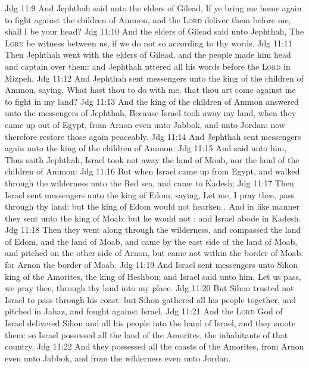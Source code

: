 \vs Jdg 11:9 And Jephthah said unto the elders of Gilead, If ye bring me home again to fight against the children of Ammon, and the \textsc{Lord} deliver them before me, shall I be your head?
\vs Jdg 11:10 And the elders of Gilead said unto Jephthah, The \textsc{Lord} be witness between us, if we do not so according to thy words.
\vs Jdg 11:11 Then Jephthah went with the elders of Gilead, and the people made him head and captain over them: and Jephthah uttered all his words before the \textsc{Lord} in Mizpeh.
\vs Jdg 11:12 And Jephthah sent messengers unto the king of the children of Ammon, saying, What hast thou to do with me, that thou art come against me to fight in my land?
\vs Jdg 11:13 And the king of the children of Ammon answered unto the messengers of Jephthah, Because Israel took away my land, when they came up out of Egypt, from Arnon even unto Jabbok, and unto Jordan: now therefore restore those  again peaceably.
\vs Jdg 11:14 And Jephthah sent messengers again unto the king of the children of Ammon:
\vs Jdg 11:15 And said unto him, Thus saith Jephthah, Israel took not away the land of Moab, nor the land of the children of Ammon:
\vs Jdg 11:16 But when Israel came up from Egypt, and walked through the wilderness unto the Red sea, and came to Kadesh;
\vs Jdg 11:17 Then Israel sent messengers unto the king of Edom, saying, Let me, I pray thee, pass through thy land: but the king of Edom would not hearken . And in like manner they sent unto the king of Moab: but he would not : and Israel abode in Kadesh.
\vs Jdg 11:18 Then they went along through the wilderness, and compassed the land of Edom, and the land of Moab, and came by the east side of the land of Moab, and pitched on the other side of Arnon, but came not within the border of Moab: for Arnon  the border of Moab.
\vs Jdg 11:19 And Israel sent messengers unto Sihon king of the Amorites, the king of Heshbon; and Israel said unto him, Let us pass, we pray thee, through thy land into my place.
\vs Jdg 11:20 But Sihon trusted not Israel to pass through his coast: but Sihon gathered all his people together, and pitched in Jahaz, and fought against Israel.
\vs Jdg 11:21 And the \textsc{Lord} God of Israel delivered Sihon and all his people into the hand of Israel, and they smote them: so Israel possessed all the land of the Amorites, the inhabitants of that country.
\vs Jdg 11:22 And they possessed all the coasts of the Amorites, from Arnon even unto Jabbok, and from the wilderness even unto Jordan.
